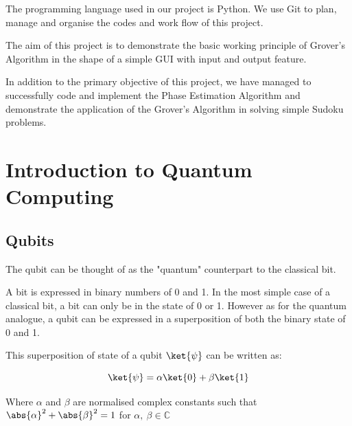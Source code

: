\documentclass{article}
\begin{document}
\noindent
The programming language used in our project is Python. We use Git to plan, manage and organise the codes and work flow of this project. 
\vspace{5mm}

\noindent
The aim of this project is to demonstrate the basic working principle of Grover's Algorithm in the shape of a simple GUI with input and output feature.
\vspace{5mm}

\noindent
In addition to the primary objective of this project, we have managed to successfully code and implement the Phase Estimation Algorithm and demonstrate the application of the Grover's Algorithm in solving simple Sudoku problems.
\pagebreak


\tableofcontents %
\pagebreak

\section{Introduction to Quantum Computing}
\vspace{5mm}

\subsection{Qubits}
\vspace{5mm}

The qubit can be thought of as the "quantum" counterpart to the classical bit. 
\vspace{5mm}

\noindent
A bit is expressed in binary numbers of 0 and 1. In the most simple case of a classical bit, a bit can only be in the state of 0 or 1. However as for the quantum analogue, a qubit can be expressed in a superposition of both the binary state of 0 and 1.
\vspace{5mm}

\noindent
This superposition of state of a qubit $\ket{\psi}$ can be written as:
\vspace{5mm}

\begin{equation}
     \ket{\psi} = \alpha\ket{0} + \beta\ket{1}
\end{equation}
\vspace{5mm}

\noindent
Where $\alpha$ and $\beta$ are normalised complex constants such that $\abs{\alpha}^2 + \abs{\beta}^2 = 1$  for $\alpha, \ \beta \in \mathbb{C} $
\vspace{5mm}
\end{document}
